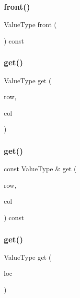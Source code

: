 \mbox{\label{classGrid_abaa174a9d74f7e7e38d4944fa43b5a33}} 
\subsubsection{\texorpdfstring{front()}{front()}}
{\footnotesize\ttfamily Value\+Type front (\begin{DoxyParamCaption}{ }\end{DoxyParamCaption}) const}

\mbox{\label{classGrid_a49fcb88bae29483f4cb0858f29f6384e}} 
\subsubsection{\texorpdfstring{get()}{get()}\hspace{0.1cm}{\footnotesize\ttfamily [1/4]}}
{\footnotesize\ttfamily Value\+Type get (\begin{DoxyParamCaption}\item[{int}]{row,  }\item[{int}]{col }\end{DoxyParamCaption})}

\mbox{\label{classGrid_a2b88a9c3e739296050588ad389667146}} 
\subsubsection{\texorpdfstring{get()}{get()}\hspace{0.1cm}{\footnotesize\ttfamily [2/4]}}
{\footnotesize\ttfamily const Value\+Type \& get (\begin{DoxyParamCaption}\item[{int}]{row,  }\item[{int}]{col }\end{DoxyParamCaption}) const}

\mbox{\label{classGrid_a9f9ad65f113e87072ae3b470ba803644}} 
\subsubsection{\texorpdfstring{get()}{get()}\hspace{0.1cm}{\footnotesize\ttfamily [3/4]}}
{\footnotesize\ttfamily Value\+Type get (\begin{DoxyParamCaption}\item[{const \mbox{\hyperlink{structGridLocation}{Grid\+Location}} \&}]{loc }\end{DoxyParamCaption})}

